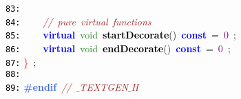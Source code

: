 \documentclass{article}
\begin{document}
\mbox{}\texttt{\textcolor{Black}{83:}}  \\
\mbox{}\texttt{\textcolor{Black}{84:}} \ \ \ \ \textit{\textcolor{Brown}{//\ pure\ virtual\ functions}} \\
\mbox{}\texttt{\textcolor{Black}{85:}} \ \ \ \ \textbf{\textcolor{Blue}{virtual}}\ \textcolor{ForestGreen}{void}\ \textbf{\textcolor{Black}{startDecorate}}\textcolor{BrickRed}{()}\ \textbf{\textcolor{Blue}{const}}\ \textcolor{BrickRed}{=}\ \textcolor{Purple}{0}\ \textcolor{BrickRed}{;} \\
\mbox{}\texttt{\textcolor{Black}{86:}} \ \ \ \ \textbf{\textcolor{Blue}{virtual}}\ \textcolor{ForestGreen}{void}\ \textbf{\textcolor{Black}{endDecorate}}\textcolor{BrickRed}{()}\ \textbf{\textcolor{Blue}{const}}\ \textcolor{BrickRed}{=}\ \textcolor{Purple}{0}\ \textcolor{BrickRed}{;} \\
\mbox{}\texttt{\textcolor{Black}{87:}} \textcolor{Red}{\}}\ \textcolor{BrickRed}{;} \\
\mbox{}\texttt{\textcolor{Black}{88:}}  \\
\mbox{}\texttt{\textcolor{Black}{89:}} \textbf{\textcolor{RoyalBlue}{\#endif}}\ \textit{\textcolor{Brown}{//\ $\_$TEXTGEN$\_$H}} \\
\end{document}
